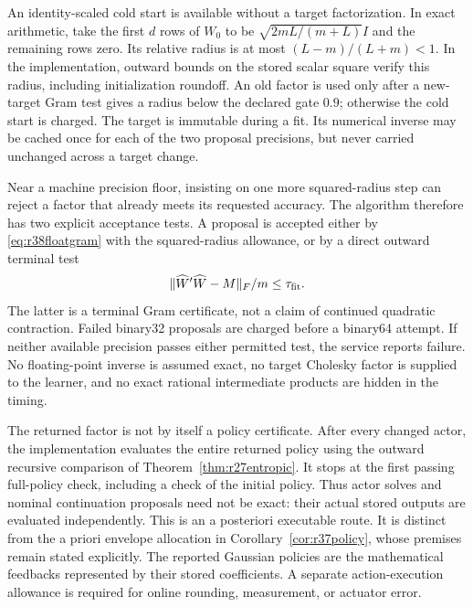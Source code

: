 An identity-scaled cold start is available without a target factorization.
In exact arithmetic, take the first $d$ rows of $W_0$ to be
$\sqrt{2mL/(m+L)}I$ and the remaining rows zero. Its relative radius is at
most $(L-m)/(L+m)<1$. In the implementation, outward bounds on the stored
scalar square verify this radius, including initialization roundoff. An
old factor is used only after a new-target Gram test gives a radius below
the declared gate $0.9$; otherwise the cold start is charged. The target is
immutable during a fit. Its numerical inverse may be cached once for each
of the two proposal precisions, but never carried unchanged across a target
change.

Near a machine precision floor, insisting on one more squared-radius step
can reject a factor that already meets its requested accuracy. The algorithm
therefore has two explicit acceptance tests. A proposal is accepted either
by \eqref{eq:r38floatgram} with the squared-radius allowance, or by a direct
outward terminal test
\[
 \|\widehat W'\widehat W-M\|_F/m\leq\tau_{\rm fit}.
\]
The latter is a terminal Gram certificate, not a claim of continued
quadratic contraction. Failed binary32 proposals are charged before a
binary64 attempt. If neither available precision passes either permitted
test, the service reports failure. No floating-point inverse is assumed
exact, no target Cholesky factor is supplied to the learner, and no exact
rational intermediate products are hidden in the timing.

The returned factor is not by itself a policy certificate. After every
changed actor, the implementation evaluates the entire returned policy
using the outward recursive comparison of
Theorem~\ref{thm:r27entropic}. It stops at the first passing full-policy
check, including a check of the initial policy. Thus actor solves and
nominal continuation proposals need not be exact: their actual stored
outputs are evaluated independently. This is an a posteriori executable
route. It is distinct from the a priori envelope allocation in
Corollary~\ref{cor:r37policy}, whose premises remain stated explicitly.
The reported Gaussian policies are the mathematical feedbacks represented
by their stored coefficients. A separate action-execution allowance is
required for online rounding, measurement, or actuator error.

